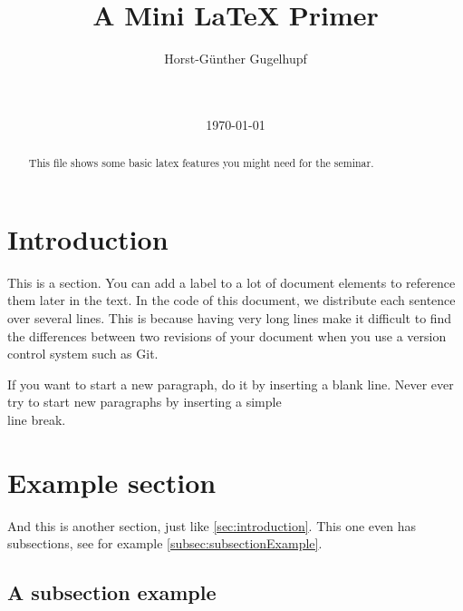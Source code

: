 \documentclass{acm_proc_article-sp}
\begin{document}
\title{A Mini LaTeX Primer}
\author{
	\alignauthor
	Horst-Günther Gugelhupf\\
	\\
	\\
}

\date{\today}

\maketitle

\begin{abstract}
  This file shows some basic latex features
  you might need for the seminar. 
\end{abstract}


\section{Introduction}
\label{sec:introduction}

This is a section.
You can add a label
to a lot of document elements
to reference them later in the text.
In the code of this document,
we distribute each sentence
over several lines.
This is because having very long lines
make it difficult to find the differences
between two revisions of your document
when you use a version control system
such as Git.

If you want to start a new paragraph,
do it by inserting a blank line.
Never ever try to start new paragraphs
by inserting a simple\\line break.


\section{Example section}
\label{sec:exampleSection}

And this is another section,
just like \autoref{sec:introduction}.
This one even has subsections,
see for example \autoref{subsec:subsectionExample}.


\subsection{A subsection example}
\label{subsec:subsectionExample}
\end{document}
